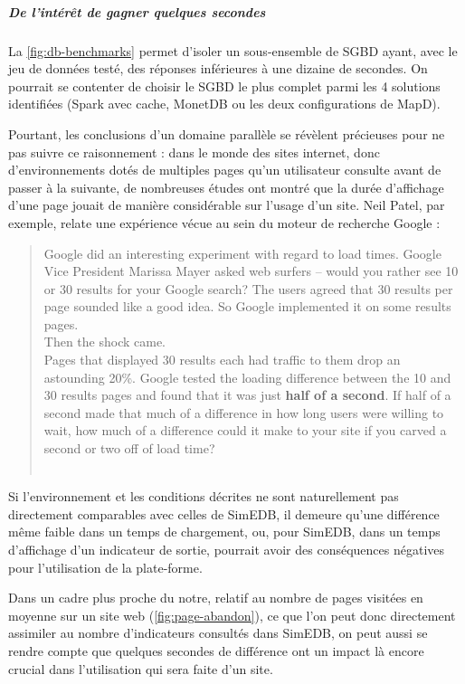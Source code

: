 			\subparagraph{De l'intérêt de gagner quelques secondes}

			La \cref{fig:db-benchmarks} permet d'isoler un sous-ensemble de SGBD ayant, avec le jeu de données testé, des réponses inférieures à une dizaine de secondes.
			On pourrait se contenter de choisir le SGBD le plus complet parmi les 4 solutions identifiées (Spark avec cache, MonetDB ou les deux configurations de MapD).

			Pourtant, les conclusions d'un domaine parallèle se révèlent précieuses pour ne pas suivre ce raisonnement :
			dans le monde des sites internet, donc d'environnements dotés de multiples pages qu'un utilisateur consulte avant de passer à la suivante, de nombreuses études ont montré que la durée d'affichage d'une page jouait de manière considérable sur l'usage d'un site.
			Neil Patel, par exemple, relate une expérience vécue au sein du moteur de recherche Google  :

			\begin{quotation}
				\og
			Google did an interesting experiment with regard to load times. Google Vice President Marissa Mayer asked web surfers – would you rather see 10 or 30 results for your Google search? The users agreed that 30 results per page sounded like a good idea. So Google implemented it on some results pages.\\
			Then the shock came.\\
			Pages that displayed 30 results each had traffic to them drop an astounding 20\%. Google tested the loading difference between the 10 and 30 results pages and found that it was just \textbf{half of a second}. If half of a second made that much of a difference in how long users were willing to wait, how much of a difference could it make to your site if you carved a second or two off of load time?
				\fg{}\\
				\mbox{}~ \hfill  \autocite{patel_speed_2011}
			\end{quotation}

			Si l'environnement et les conditions décrites ne sont naturellement pas directement comparables avec celles de SimEDB, il demeure qu'une différence même faible dans un temps de chargement, ou, pour SimEDB, dans un temps d'affichage d'un indicateur de sortie, pourrait avoir des conséquences négatives pour l'utilisation de la plate-forme.

			Dans un cadre plus proche du notre, relatif au nombre de pages visitées en moyenne sur un site web (\cref{fig:page-abandon}), ce que l'on peut donc directement assimiler au nombre d'indicateurs consultés dans SimEDB, on peut aussi se rendre compte que quelques secondes de différence ont un impact là encore crucial dans l'utilisation qui sera faite d'un site.


